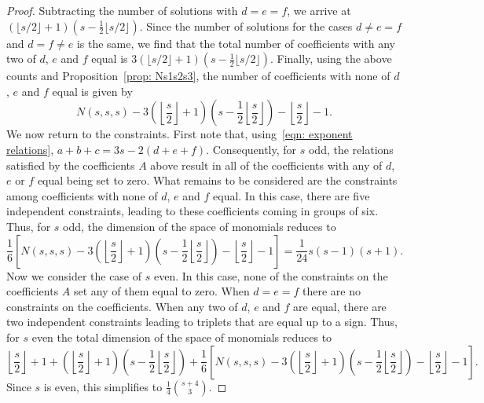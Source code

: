 \documentclass[12pt,a4paper]{extarticle}
\theoremstyle{definition}
\begin{document}
\begin{proof}
    Subtracting the number of solutions with $d=e=f$, we arrive at $(\lfloor s/2\rfloor + 1)(s-\frac{1}{2}\lfloor s/2\rfloor)$. Since the number of solutions for the cases $d\neq e=f$ and $d=f\neq e$ is the same, we find that the total number of coefficients with any two of $d$, $e$ and $f$ equal is $3(\lfloor s/2\rfloor + 1)(s-\frac{1}{2}\lfloor s/2\rfloor)$. Finally, using the above counts and Proposition~\ref{prop: Ns1s2s3}, the number of coefficients with none of $d$, $e$ and $f$ equal is given by
    \begin{equation*}
        N(s,s,s)-3\left(\left\lfloor\dfrac{s}{2}\right\rfloor+1\right)\left(s-\frac{1}{2}\left\lfloor\frac{s}{2}\right\rfloor\right)-\left\lfloor \dfrac{s}{2}\right\rfloor-1.
    \end{equation*}
    We now return to the constraints. First note that, using~\eqref{eqn: exponent relations}, $a+b+c=3s-2(d+e+f)$. Consequently, for $s$ odd, the relations satisfied by the coefficients $A$ above result in all of the coefficients with any of $d$, $e$ or $f$ equal being set to zero. What remains to be considered are the constraints among coefficients with none of $d$, $e$ and $f$ equal. In this case, there are five independent constraints, leading to these coefficients coming in groups of six. Thus, for $s$ odd, the dimension of the space of monomials reduces to
    \begin{equation*}
        \frac{1}{6}\left[N(s,s,s)-3\left(\left\lfloor\dfrac{s}{2}\right\rfloor+1\right)\left(s-\frac{1}{2}\left\lfloor\frac{s}{2}\right\rfloor\right)-\left\lfloor \dfrac{s}{2}\right\rfloor-1\right]=\frac{1}{24}s(s-1)(s+1).
    \end{equation*}
    Now we consider the case of $s$ even. In this case, none of the constraints on the coefficients $A$ set any of them equal to zero. When $d=e=f$ there are no constraints on the coefficients. When any two of $d$, $e$ and $f$ are equal, there are two independent constraints leading to triplets that are equal up to a sign. Thus, for $s$ even %
    the total dimension of the space of monomials reduces to
    \begin{equation*}
        \left\lfloor\dfrac{s}{2}\right\rfloor+1+\left(\left\lfloor\dfrac{s}{2}\right\rfloor+1\right)\left(s-\frac{1}{2}\left\lfloor\dfrac{s}{2}\right\rfloor\right)+\frac{1}{6}\left[N(s,s,s)-3\left(\left\lfloor\dfrac{s}{2}\right\rfloor+1\right)\left(s-\frac{1}{2}\left\lfloor\frac{s}{2}\right\rfloor\right)-\left\lfloor \dfrac{s}{2}\right\rfloor-1\right].
    \end{equation*}
    Since $s$ is even, this simplifies to $\frac{1}{4}\binom{s+4}{3}$.
\end{proof}
\end{document}
